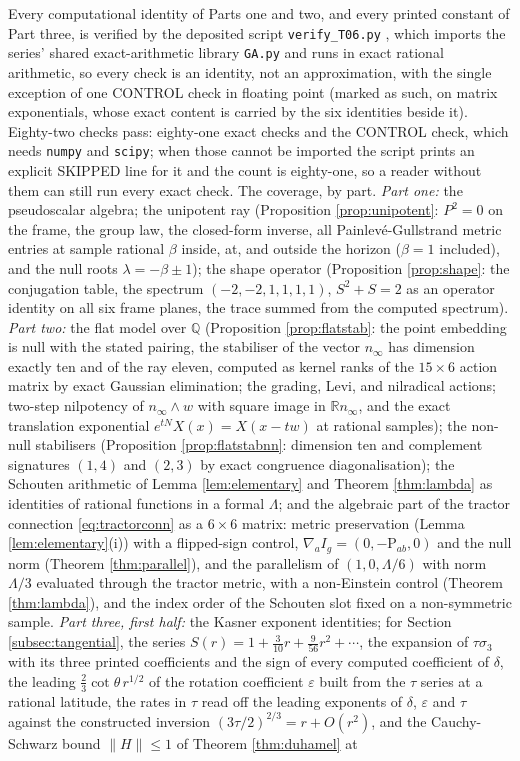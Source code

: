 \documentclass[11pt]{article}
\theoremstyle{definition}
\newcommand{\R}{\mathbb{R}}
\newcommand{\Sch}{\mathrm{P}}
\newcommand{\nInf}{n_\infty}
\begin{document}
Every computational identity of Parts one and two, and every printed constant of Part three, is verified by the deposited script \verb|verify_T06.py| \cite{ButlerVerifyT06}, which imports the series' shared exact-arithmetic library \verb|GA.py| and runs in exact rational arithmetic, so every check is an identity, not an approximation, with the single exception of one CONTROL check in floating point (marked as such, on matrix exponentials, whose exact content is carried by the six identities beside it). Eighty-two checks pass: eighty-one exact checks and the CONTROL check, which needs \verb|numpy| and \verb|scipy|; when those cannot be imported the script prints an explicit SKIPPED line for it and the count is eighty-one, so a reader without them can still run every exact check. The coverage, by part. \emph{Part one:} the pseudoscalar algebra; the unipotent ray (Proposition \ref{prop:unipotent}: $P^2 = 0$ on the frame, the group law, the closed-form inverse, all Painlev\'e-Gullstrand metric entries at sample rational $\beta$ inside, at, and outside the horizon ($\beta = 1$ included), and the null roots $\lambda = -\beta \pm 1$); the shape operator (Proposition \ref{prop:shape}: the conjugation table, the spectrum $(-2,-2,1,1,1,1)$, $S^2 + S = 2$ as an operator identity on all six frame planes, the trace summed from the computed spectrum). \emph{Part two:} the flat model over $\mathbb{Q}$ (Proposition \ref{prop:flatstab}: the point embedding is null with the stated pairing, the stabiliser of the vector $\nInf$ has dimension exactly ten and of the ray eleven, computed as kernel ranks of the $15 \times 6$ action matrix by exact Gaussian elimination; the grading, Levi, and nilradical actions; two-step nilpotency of $\nInf \wedge w$ with square image in $\R\nInf$, and the exact translation exponential $e^{tN}X(x) = X(x - tw)$ at rational samples); the non-null stabilisers (Proposition \ref{prop:flatstabnn}: dimension ten and complement signatures $(1,4)$ and $(2,3)$ by exact congruence diagonalisation); the Schouten arithmetic of Lemma \ref{lem:elementary} and Theorem \ref{thm:lambda} as identities of rational functions in a formal $\Lambda$; and the algebraic part of the tractor connection \eqref{eq:tractorconn} as a $6 \times 6$ matrix: metric preservation (Lemma \ref{lem:elementary}(i)) with a flipped-sign control, $\nabla_a I_g = (0, -\Sch_{ab}, 0)$ and the null norm (Theorem \ref{thm:parallel}), and the parallelism of $(1, 0, \Lambda/6)$ with norm $\Lambda/3$ evaluated through the tractor metric, with a non-Einstein control (Theorem \ref{thm:lambda}), and the index order of the Schouten slot fixed on a non-symmetric sample. \emph{Part three, first half:} the Kasner exponent identities; for Section \ref{subsec:tangential}, the series $S(r) = 1 + \tfrac{3}{10}r + \tfrac{9}{56}r^2 + \cdots$, the expansion of $\tau\sigma_3$ with its three printed coefficients and the sign of every computed coefficient of $\delta$, the leading $\tfrac23\cot\theta\, r^{1/2}$ of the rotation coefficient $\varepsilon$ built from the $\tau$ series at a rational latitude, the rates in $\tau$ read off the leading exponents of $\delta$, $\varepsilon$ and $\tau$ against the constructed inversion $(3\tau/2)^{2/3} = r + O(r^2)$, and the Cauchy-Schwarz bound $\|H\| \le 1$ of Theorem \ref{thm:duhamel} at 
\end{document}
